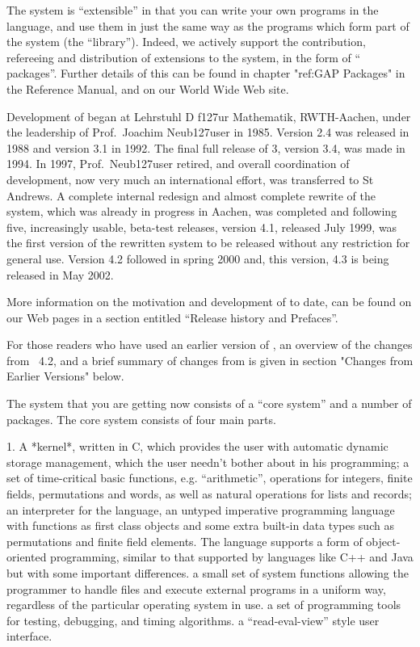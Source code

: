 The system is ``extensible'' in that you can write your own  programs  in
the {\GAP} language, and use them in just the same way  as  the  programs
which form part of the system  (the  ``library'').  Indeed,  we  actively
support the contribution, refereeing and distribution  of  extensions  to
the system, in the form of ``{\GAP} packages''.  Further details of  this
can be found in chapter "ref:GAP Packages" in the Reference Manual, and
on our World Wide Web site.

Development of {\GAP} began at Lehrstuhl D f\accent127ur Mathematik,
RWTH-Aachen, under the leadership of Prof.~Joachim Neub\accent127user
in 1985. Version 2.4 was released in 1988 and version 3.1 in 1992.
The final full release of {\GAP} 3, version 3.4, was made in 1994. In
1997, Prof.~Neub\accent127user retired, and overall coordination of
{\GAP} development, now very much an international effort, was
transferred to St Andrews.  A complete internal redesign and almost
complete rewrite of the system, which was already in progress in
Aachen, was completed and following five, increasingly usable,
beta-test releases, version 4.1, released July 1999, was the first
version of the rewritten system to be released without any restriction
for general use. Version 4.2 followed in spring 2000 and, this
version, {\GAP} 4.3 is being released in May 2002.

More information on the motivation and development of {\GAP} to date,
can be found on our Web pages in a section entitled ``Release history
and Prefaces''.

For those readers who have used an earlier version of {\GAP}, an
overview of the changes from {\GAP}~4.2, and a brief summary of
changes from {} is given in section "Changes from Earlier
Versions" below.

The system that you are getting now consists of a ``core system'' and
a number of packages. The core system consists of four main parts.
\beginlist%
  \item{1.}
    A  *kernel*, written in C, which provides the user with
    \itemitem{--}%
      automatic dynamic storage management, which the user needn't bother
      about in his programming;
    \itemitem{--}
      a   set of  time-critical basic   functions, e.g.   ``arithmetic'',
      operations for integers, finite fields,  permutations and words, as
      well as natural operations for lists and records;
    \itemitem{--} 
      an interpreter   for  the {\GAP} language,    an untyped
      imperative programming language with functions as first class objects
      and some extra built-in data types such as permutations and finite
      field elements.  The language supports a form of object-oriented
      programming, similar to that supported by languages like C++ and
      Java but with some important differences.
    \itemitem{--}
      a small set of system functions allowing the {\GAP} programmer to handle
      files and execute external programs in a uniform way, regardless of 
      the particular operating system in use. 
    \itemitem{--}
      a  set  of programming tools  for   testing, debugging, and timing
      algorithms.
    \itemitem{--}
      a ``read-eval-view'' style user interface.

